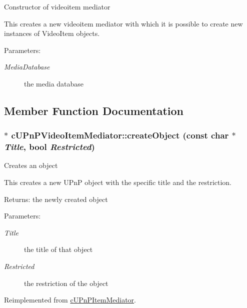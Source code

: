 Constructor of videoitem mediator

This creates a new videoitem mediator with which it is possible to create new instances of VideoItem objects.

\begin{Desc}
\item[Parameters:]
\begin{description}
\item[{\em MediaDatabase}]the media database \end{description}
\end{Desc}


\subsection{Member Function Documentation}
\hypertarget{classcUPnPVideoItemMediator_27e001142c3651c36dfd3b7c450414c0}{
\subsubsection[{createObject}]{ $\ast$ cUPnPVideoItemMediator::createObject (const char $\ast$ {\em Title}, \/  bool {\em Restricted})}}
\label{classcUPnPVideoItemMediator_27e001142c3651c36dfd3b7c450414c0}


Creates an object

This creates a new UPnP object with the specific title and the restriction.

\begin{Desc}
\item[Returns:]the newly created object \end{Desc}
\begin{Desc}
\item[Parameters:]
\begin{description}
\item[{\em Title}]the title of that object \item[{\em Restricted}]the restriction of the object \end{description}
\end{Desc}
  

Reimplemented from \hyperlink{classcUPnPItemMediator_e2fd4cf5e6435f1eeadd11f9a99cd2db}{cUPnPItemMediator}.

